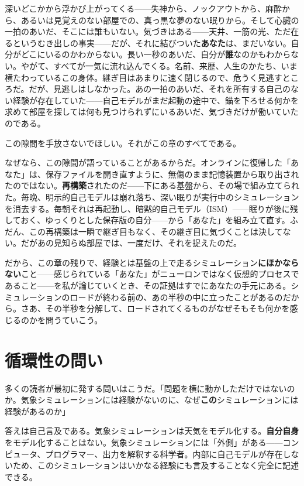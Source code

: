 \documentclass[11pt, twoside, openright]{book}
\begin{document}
深いどこかから浮かび上がってくる------失神から、ノックアウトから、麻酔から、あるいは見覚えのない部屋での、真っ黒な夢のない眠りから。そして心臓の一拍のあいだ、そこには誰もいない。気づきはある------天井、一筋の光、ただ在るというむき出しの事実------だが、それに結びついた\textbf{あなた}は、まだいない。自分がどこにいるのかわからない。長い一秒のあいだ、自分が\textbf{誰}なのかもわからない。やがて、すべてが一気に流れ込んでくる。名前、来歴、人生のかたち、いま横たわっているこの身体。継ぎ目はあまりに速く閉じるので、危うく見逃すところだ。だが、見逃しはしなかった。あの一拍のあいだ、それを所有する自己のない経験が存在していた------自己モデルがまだ起動の途中で、錨を下ろせる何かを求めて部屋を探しては何も見つけられずにいるあいだ、気づきだけが働いていたのである。

この隙間を手放さないでほしい。それがこの章のすべてである。

なぜなら、この隙間が語っていることがあるからだ。オンラインに復帰した「あなた」は、保存ファイルを開き直すように、無傷のまま記憶装置から取り出されたのではない。\textbf{再構築}されたのだ------下にある基盤から、その場で組み立てられた。毎晩、明示的自己モデルは崩れ落ち、深い眠りが実行中のシミュレーションを消去する。毎朝それは再起動し、暗黙的自己モデル（ISM）------眠りが後に残しておく、ゆっくりとした保存版の自分------から「あなた」を組み立て直す。ふだん、この再構築は一瞬で継ぎ目もなく、その継ぎ目に気づくことは決してない。だがあの見知らぬ部屋では、一度だけ、それを捉えたのだ。

だから、この章の残りで、経験とは基盤の上で走るシミュレーション\textbf{にほかならない}こと------感じられている「あなた」がニューロンではなく仮想的プロセスであること------を私が論じていくとき、その証拠はすでにあなたの手元にある。シミュレーションのロードが終わる前の、あの半秒の中に立ったことがあるのだから。さあ、その半秒を分解して、ロードされてくるものがなぜそもそも何かを感じるのかを問うていこう。

\section*{循環性の問い}

多くの読者が最初に発する問いはこうだ。「問題を横に動かしただけではないのか。気象シミュレーションには経験がないのに、なぜ\textbf{この}シミュレーションには経験があるのか」

答えは自己言及である。気象シミュレーションは天気をモデル化する。\textbf{自分自身}をモデル化することはない。気象シミュレーションには「外側」がある------コンピュータ、プログラマー、出力を解釈する科学者。内部に自己モデルが存在しないため、このシミュレーションはいかなる経験にも言及することなく完全に記述できる。
\end{document}
